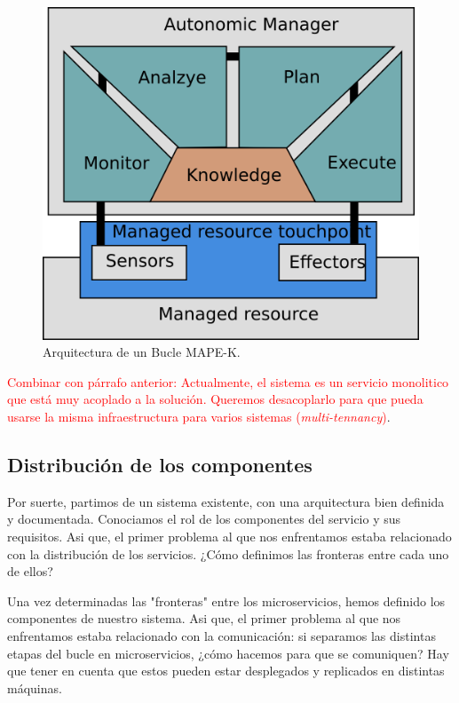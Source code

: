 \begin{figure}[h]
  \centering
  \includegraphics[scale=0.6]{01_introduccion/images/bucle-mape-k.png}
  \caption[Arquitectura de un Bucle MAPE-K.]{Arquitectura de un Bucle MAPE-K.\footnotemark}
  \label{fig:bucle-mapek2}
\end{figure}


\textcolor{red}{Combinar con párrafo anterior: Actualmente, el sistema es un servicio monolitico que está muy acoplado a la solución. Queremos desacoplarlo para que pueda usarse la misma infraestructura para varios sistemas (\textit{multi-tennancy})}.

\subsection{Distribución de los componentes}

Por suerte, partimos de un sistema existente, con una arquitectura bien definida y documentada. Conociamos el rol de los componentes del servicio y sus requisitos. Asi que, el primer problema al que nos enfrentamos estaba relacionado con la distribución de los servicios. ¿Cómo definimos las fronteras entre cada uno de ellos?

Una vez determinadas las "fronteras" entre los microservicios, hemos definido los componentes de nuestro sistema. Asi que, el primer problema al que nos enfrentamos estaba relacionado con la comunicación: si separamos las distintas etapas del bucle en microservicios, ¿cómo hacemos para que se comuniquen? Hay que tener en cuenta que estos pueden estar desplegados y replicados en distintas máquinas.

